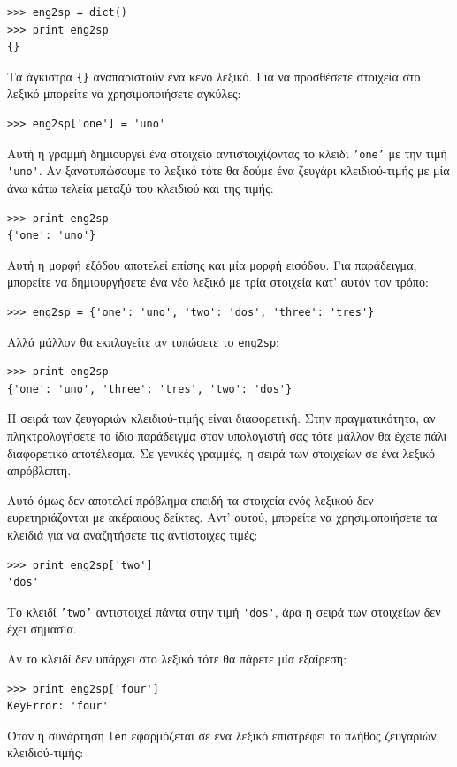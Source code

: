 \documentclass[10pt]{book}
\begin{document}
\begin{verbatim}
>>> eng2sp = dict()
>>> print eng2sp
{}
\end{verbatim}

Τα άγκιστρα \verb"{}" αναπαριστούν ένα κενό λεξικό. Για να προσθέσετε στοιχεία στο λεξικό μπορείτε να χρησιμοποιήσετε αγκύλες:

\begin{verbatim}
>>> eng2sp['one'] = 'uno'
\end{verbatim}
%
Αυτή η γραμμή δημιουργεί ένα στοιχείο αντιστοιχίζοντας το κλειδί {\tt 'one'}
με την τιμή \verb"'uno'". Αν ξανατυπώσουμε το λεξικό τότε θα δούμε ένα ζευγάρι κλειδιού-τιμής με μία άνω κάτω τελεία μεταξύ του κλειδιού και της τιμής:

\begin{verbatim}
>>> print eng2sp
{'one': 'uno'}
\end{verbatim}
%
Αυτή η μορφή εξόδου αποτελεί επίσης και μία μορφή εισόδου. Για παράδειγμα, μπορείτε να δημιουργήσετε ένα νέο λεξικό με τρία στοιχεία κατ' αυτόν τον τρόπο:

\begin{verbatim}
>>> eng2sp = {'one': 'uno', 'two': 'dos', 'three': 'tres'}
\end{verbatim}
%
Αλλά μάλλον θα εκπλαγείτε αν τυπώσετε το {\tt eng2sp}:

\begin{verbatim}
>>> print eng2sp
{'one': 'uno', 'three': 'tres', 'two': 'dos'}
\end{verbatim}
%
Η σειρά των ζευγαριών κλειδιού-τιμής είναι διαφορετική. Στην πραγματικότητα, αν πληκτρολογήσετε το ίδιο παράδειγμα στον υπολογιστή σας τότε μάλλον θα έχετε πάλι διαφορετικό αποτέλεσμα. Σε γενικές γραμμές, η σειρά των στοιχείων σε ένα λεξικό απρόβλεπτη. 

Αυτό όμως δεν αποτελεί πρόβλημα επειδή τα στοιχεία ενός λεξικού δεν ευρετηριάζονται με ακέραιους δείκτες. Αντ' αυτού, μπορείτε να χρησιμοποιήσετε τα κλειδιά για να αναζητήσετε τις αντίστοιχες τιμές:

\begin{verbatim}
>>> print eng2sp['two']
'dos'
\end{verbatim}
%
Το κλειδί {\tt 'two'} αντιστοιχεί πάντα στην τιμή \verb"'dos'", άρα η σειρά των στοιχείων δεν έχει σημασία.

Αν το κλειδί δεν υπάρχει στο λεξικό τότε θα πάρετε μία εξαίρεση:

\begin{verbatim}
>>> print eng2sp['four']
KeyError: 'four'
\end{verbatim}
%
Όταν η συνάρτηση {\tt len} εφαρμόζεται σε ένα λεξικό επιστρέφει το πλήθος ζευγαριών κλειδιού-τιμής:
\end{document}
